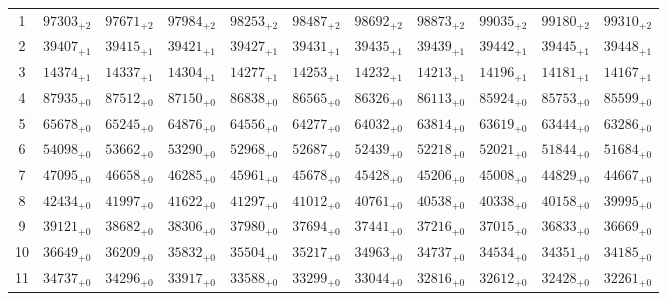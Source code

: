 \documentclass[10pt, a4paper]{article}
\begin{document}
\begin{center}
\begin{tabular}{c || c c c c c | c c c c c}
        1 & \({97303}_{+2}\) & \({97671}_{+2}\) & \({97984}_{+2}\) & \({98253}_{+2}\) & \({98487}_{+2}\) & \({98692}_{+2}\) & \({98873}_{+2}\) & \({99035}_{+2}\) & \({99180}_{+2}\) & \({99310}_{+2}\)\\
        2 & \({39407}_{+1}\) & \({39415}_{+1}\) & \({39421}_{+1}\) & \({39427}_{+1}\) & \({39431}_{+1}\) & \({39435}_{+1}\) & \({39439}_{+1}\) & \({39442}_{+1}\) & \({39445}_{+1}\) & \({39448}_{+1}\)\\
        3 & \({14374}_{+1}\) & \({14337}_{+1}\) & \({14304}_{+1}\) & \({14277}_{+1}\) & \({14253}_{+1}\) & \({14232}_{+1}\) & \({14213}_{+1}\) & \({14196}_{+1}\) & \({14181}_{+1}\) & \({14167}_{+1}\)\\
        4 & \({87935}_{+0}\) & \({87512}_{+0}\) & \({87150}_{+0}\) & \({86838}_{+0}\) & \({86565}_{+0}\) & \({86326}_{+0}\) & \({86113}_{+0}\) & \({85924}_{+0}\) & \({85753}_{+0}\) & \({85599}_{+0}\)\\
        5 & \({65678}_{+0}\) & \({65245}_{+0}\) & \({64876}_{+0}\) & \({64556}_{+0}\) & \({64277}_{+0}\) & \({64032}_{+0}\) & \({63814}_{+0}\) & \({63619}_{+0}\) & \({63444}_{+0}\) & \({63286}_{+0}\)\\
        \hline
        6 & \({54098}_{+0}\) & \({53662}_{+0}\) & \({53290}_{+0}\) & \({52968}_{+0}\) & \({52687}_{+0}\) & \({52439}_{+0}\) & \({52218}_{+0}\) & \({52021}_{+0}\) & \({51844}_{+0}\) & \({51684}_{+0}\)\\
        7 & \({47095}_{+0}\) & \({46658}_{+0}\) & \({46285}_{+0}\) & \({45961}_{+0}\) & \({45678}_{+0}\) & \({45428}_{+0}\) & \({45206}_{+0}\) & \({45008}_{+0}\) & \({44829}_{+0}\) & \({44667}_{+0}\)\\
        8 & \({42434}_{+0}\) & \({41997}_{+0}\) & \({41622}_{+0}\) & \({41297}_{+0}\) & \({41012}_{+0}\) & \({40761}_{+0}\) & \({40538}_{+0}\) & \({40338}_{+0}\) & \({40158}_{+0}\) & \({39995}_{+0}\)\\
        9 & \({39121}_{+0}\) & \({38682}_{+0}\) & \({38306}_{+0}\) & \({37980}_{+0}\) & \({37694}_{+0}\) & \({37441}_{+0}\) & \({37216}_{+0}\) & \({37015}_{+0}\) & \({36833}_{+0}\) & \({36669}_{+0}\)\\
        10 & \({36649}_{+0}\) & \({36209}_{+0}\) & \({35832}_{+0}\) & \({35504}_{+0}\) & \({35217}_{+0}\) & \({34963}_{+0}\) & \({34737}_{+0}\) & \({34534}_{+0}\) & \({34351}_{+0}\) & \({34185}_{+0}\)\\
        \hline
        11 & \({34737}_{+0}\) & \({34296}_{+0}\) & \({33917}_{+0}\) & \({33588}_{+0}\) & \({33299}_{+0}\) & \({33044}_{+0}\) & \({32816}_{+0}\) & \({32612}_{+0}\) & \({32428}_{+0}\) & \({32261}_{+0}\)\\

\end{tabular}
\end{center}
\end{document}

